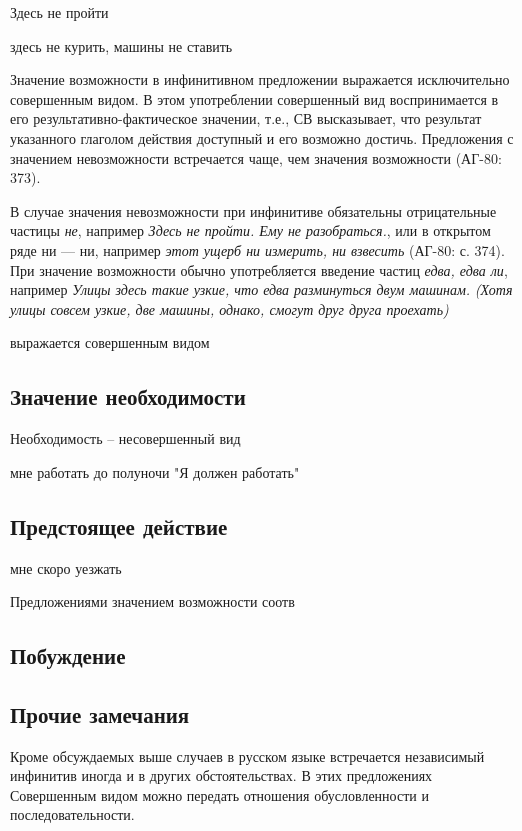 Здесь не пройти 

здесь не курить, машины не ставить



Значение возможности в инфинитивном предложении выражается исключительно совершенным видом. В этом употреблении совершенный вид воспринимается в его результативно-фактическое значении, т.е., СВ высказывает, что результат указанного глаголом действия доступный и его возможно достичь. Предложения с значением невозможности встречается чаще, чем значения возможности (АГ-80: 373). 

В случае значения невозможности при инфинитиве обязательны отрицательные частицы \textit{не}, например \textit{Здесь не пройти. Ему не разобраться.}, или в открытом ряде ни --- ни, например \textit{этот ущерб ни измерить, ни взвесить} (АГ-80: с. 374). При значение возможности обычно употребляется введение частиц \textit{едва, едва ли}, например \textit{Улицы здесь такие узкие, что едва разминуться двум машинам.} \textit{(Хотя улицы совсем узкие, две машины, однако, смогут друг друга проехать)}



выражается совершенным видом

\subsection{Значение необходимости}

Необходимость -- несовершенный вид

мне работать до полуночи
"Я должен работать"

\subsection{Предстоящее действие}

мне скоро уезжать

Предложениями значением возможности соотв

\subsection{Побуждение}

\subsection{Прочие замечания}

Кроме обсуждаемых выше случаев в русском языке встречается независимый инфинитив иногда и в других обстоятельствах. В этих предложениях Совершенным видом можно передать отношения обусловленности и последовательности. 

